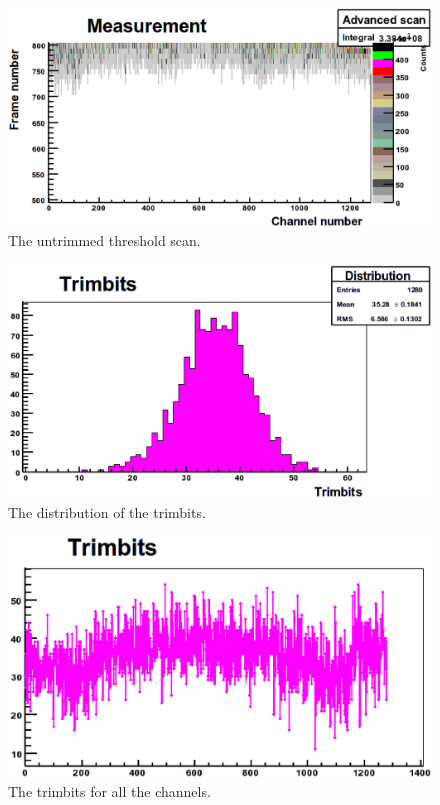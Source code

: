 \begin{figure}
\begin{center}
\includegraphics[width=\textwidth]{images/noise_thresholdscanuntrimmed}
\end{center}
\caption{The untrimmed threshold scan.}\label{fig:thresholdscanuntrimmed}
\end{figure}

\begin{figure}
\begin{center}
\includegraphics[width=\textwidth]{images/trimbitdistribution}
\end{center}
\caption{The distribution of the trimbits.}\label{fig:trimdistribution}
\end{figure}

\begin{figure}
\begin{center}
\includegraphics[width=\textwidth]{images/trimbitplot}
\end{center}
\caption{The trimbits for all the channels.}\label{fig:trimplot}
\end{figure}

